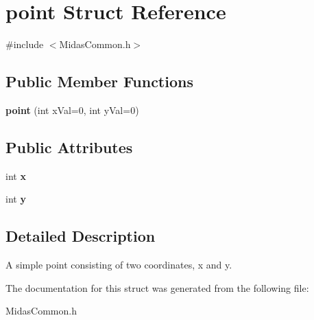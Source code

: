 \hypertarget{structpoint}{\section{point Struct Reference}
\label{structpoint}
}


{\ttfamily \#include $<$Midas\+Common.\+h$>$}

\subsection*{Public Member Functions}
\begin{DoxyCompactItemize}
\item 
\hypertarget{structpoint_a147de248dfeac81bd1c4da13e4ce01b2}{{\bfseries point} (int x\+Val=0, int y\+Val=0)}\label{structpoint_a147de248dfeac81bd1c4da13e4ce01b2}

\end{DoxyCompactItemize}
\subsection*{Public Attributes}
\begin{DoxyCompactItemize}
\item 
\hypertarget{structpoint_ad679b07fb69d55f5ad454d0f1f2891d5}{int {\bfseries x}}\label{structpoint_ad679b07fb69d55f5ad454d0f1f2891d5}

\item 
\hypertarget{structpoint_a9a82ca9504acabb1e30569f89c805471}{int {\bfseries y}}\label{structpoint_a9a82ca9504acabb1e30569f89c805471}

\end{DoxyCompactItemize}


\subsection{Detailed Description}
A simple point consisting of two coordinates, x and y. 

The documentation for this struct was generated from the following file\+:\begin{DoxyCompactItemize}
\item 
Midas\+Common.\+h\end{DoxyCompactItemize}
